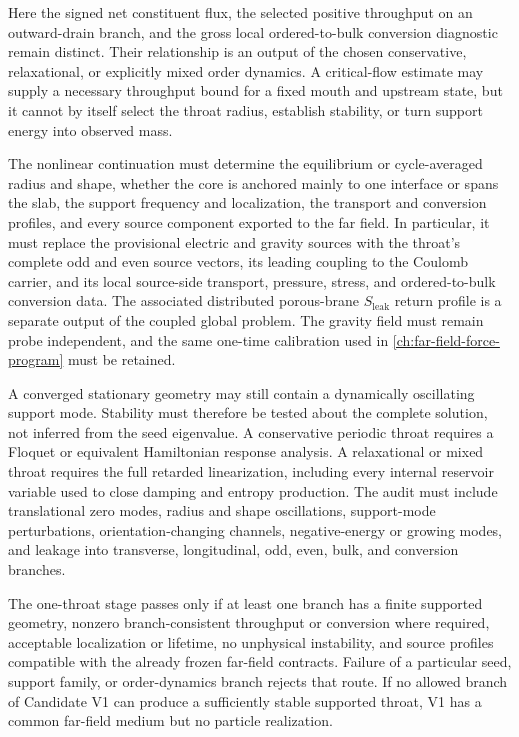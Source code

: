 Here the signed net constituent flux, the selected positive throughput on an
outward-drain branch, and the gross local ordered-to-bulk conversion diagnostic
remain distinct. Their relationship is an output of the chosen conservative,
relaxational, or explicitly mixed order dynamics. A critical-flow estimate may
supply a necessary throughput bound for a fixed mouth and upstream state, but it
cannot by itself select the throat radius, establish stability, or turn support
energy into observed mass.

The nonlinear continuation must determine the equilibrium or cycle-averaged
radius and shape, whether the core is anchored mainly to one interface or spans
the slab, the support frequency and localization, the transport and conversion
profiles, and every source component exported to the far field. In particular,
it must replace the provisional electric and gravity sources with the throat's
complete odd and even source vectors, its leading coupling to the Coulomb carrier,
and its local source-side transport, pressure, stress, and ordered-to-bulk
conversion data. The associated distributed porous-brane
\(S_{\mathrm{leak}}\) return profile is a separate output of the coupled global
problem. The gravity field must remain probe independent, and the same one-time
calibration used in \cref{ch:far-field-force-program} must be retained.

A converged stationary geometry may still contain a dynamically oscillating
support mode. Stability must therefore be tested about the complete solution,
not inferred from the seed eigenvalue. A conservative periodic throat requires a
Floquet or equivalent Hamiltonian response analysis. A relaxational or mixed
throat requires the full retarded linearization, including every internal
reservoir variable used to close damping and entropy production. The audit must
include translational zero modes, radius and shape oscillations, support-mode
perturbations, orientation-changing channels, negative-energy or growing modes,
and leakage into transverse, longitudinal, odd, even, bulk, and conversion
branches.

The one-throat stage passes only if at least one branch has a finite supported
geometry, nonzero branch-consistent throughput or conversion where required,
acceptable localization or lifetime, no unphysical instability, and source
profiles compatible with the already frozen far-field contracts. Failure of a
particular seed, support family, or order-dynamics branch rejects that route. If
no allowed branch of Candidate V1 can produce a sufficiently stable supported
throat, V1 has a common far-field medium but no particle realization.

